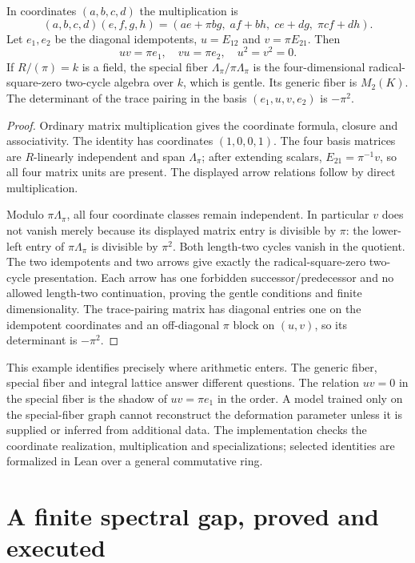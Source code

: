 \begin{proposition}
In coordinates $(a,b,c,d)$ the multiplication is
\[
 (a,b,c,d)(e,f,g,h)
 =(ae+\pi bg,\;af+bh,\;ce+dg,\;\pi cf+dh).
\]
Let $e_1,e_2$ be the diagonal idempotents, $u=E_{12}$ and $v=\pi E_{21}$. Then
\[
 uv=\pi e_1,\quad vu=\pi e_2,\quad u^2=v^2=0.
\]
If $R/(\pi)=k$ is a field, the special fiber $\Lambda_\pi/\pi\Lambda_\pi$ is the four-dimensional radical-square-zero two-cycle algebra over $k$, which is gentle. Its generic fiber is $M_2(K)$. The determinant of the trace pairing in the basis $(e_1,u,v,e_2)$ is $-\pi^2$.
\end{proposition}
\begin{proof}
Ordinary matrix multiplication gives the coordinate formula, closure and associativity. The identity has coordinates $(1,0,0,1)$. The four basis matrices are $R$-linearly independent and span $\Lambda_\pi$; after extending scalars, $E_{21}=\pi^{-1}v$, so all four matrix units are present. The displayed arrow relations follow by direct multiplication.

Modulo $\pi\Lambda_\pi$, all four coordinate classes remain independent. In particular $v$ does not vanish merely because its displayed matrix entry is divisible by $\pi$: the lower-left entry of $\pi\Lambda_\pi$ is divisible by $\pi^2$. Both length-two cycles vanish in the quotient. The two idempotents and two arrows give exactly the radical-square-zero two-cycle presentation. Each arrow has one forbidden successor/predecessor and no allowed length-two continuation, proving the gentle conditions and finite dimensionality. The trace-pairing matrix has diagonal entries one on the idempotent coordinates and an off-diagonal $\pi$ block on $(u,v)$, so its determinant is $-\pi^2$.
\end{proof}

This example identifies precisely where arithmetic enters. The generic fiber, special fiber and integral lattice answer different questions. The relation $uv=0$ in the special fiber is the shadow of $uv=\pi e_1$ in the order. A model trained only on the special-fiber graph cannot reconstruct the deformation parameter unless it is supplied or inferred from additional data. The implementation checks the coordinate realization, multiplication and specializations; selected identities are formalized in Lean over a general commutative ring.

\section{A finite spectral gap, proved and executed}

